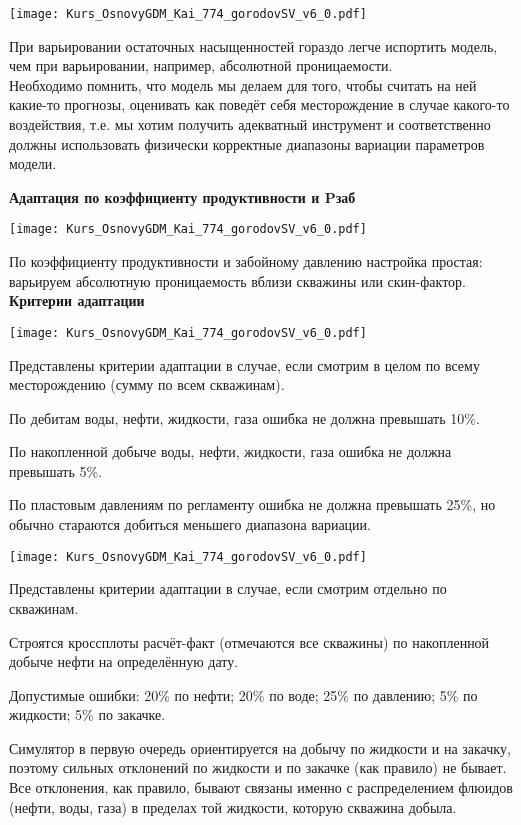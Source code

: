 \texttt{[image: Kurs\_OsnovyGDM\_Kai\_774\_gorodovSV\_v6\_0.pdf]}

При варьировании остаточных насыщенностей гораздо легче испортить модель, чем при варьировании, например, абсолютной проницаемости.
\\

Необходимо помнить, что модель мы делаем для того, чтобы считать на ней какие-то прогнозы, оценивать как поведёт себя месторождение в случае какого-то воздействия, т.е. мы хотим получить адекватный инструмент и соответственно должны использовать физически корректные диапазоны вариации параметров модели.

\textbf{Адаптация по коэффициенту продуктивности и Pзаб}

\texttt{[image: Kurs\_OsnovyGDM\_Kai\_774\_gorodovSV\_v6\_0.pdf]}

По коэффициенту продуктивности и забойному давлению настройка простая: варьируем абсолютную проницаемость вблизи скважины или скин-фактор.
\\

\textbf{Критерии адаптации}

\texttt{[image: Kurs\_OsnovyGDM\_Kai\_774\_gorodovSV\_v6\_0.pdf]}

Представлены критерии адаптации в случае, если смотрим в целом по всему месторождению (сумму по всем скважинам).

По дебитам воды, нефти, жидкости, газа ошибка не должна превышать 10\%.

По накопленной добыче воды, нефти, жидкости, газа ошибка не должна превышать 5\%.

По пластовым давлениям по регламенту ошибка не должна превышать 25\%, но обычно стараются добиться меньшего диапазона вариации.

\texttt{[image: Kurs\_OsnovyGDM\_Kai\_774\_gorodovSV\_v6\_0.pdf]}

Представлены критерии адаптации в случае, если смотрим отдельно по скважинам.

Строятся кроссплоты расчёт-факт (отмечаются все скважины) по накопленной добыче нефти на определённую дату.

Допустимые ошибки: 20\% по нефти; 20\% по воде; 25\% по давлению; 5\% по жидкости; 5\% по закачке.

Симулятор в первую очередь ориентируется на добычу по жидкости и на закачку, поэтому сильных отклонений по жидкости и по закачке (как правило) не бывает.
Все отклонения, как правило, бывают связаны именно с распределением флюидов (нефти, воды, газа) в пределах той жидкости, которую скважина добыла.

